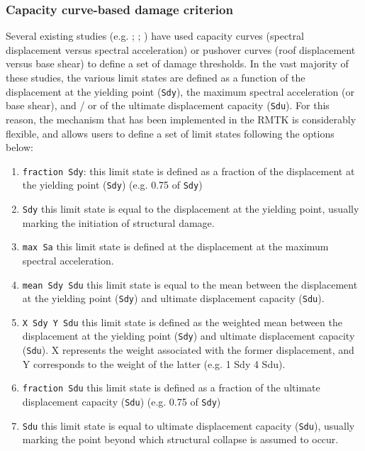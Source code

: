 \subsubsection{Capacity curve-based damage criterion}
\label{subsubsec:cc-dmg}
Several existing studies (e.g. \cite{Erberik2008}; \cite{SilvaEtAl2014c}; \cite{CasottoEtAl2005}) have used capacity curves (spectral displacement versus spectral acceleration) or pushover curves (roof displacement versus base shear) to define a set of damage thresholds. In the vast majority of these studies, the various limit states are defined as a function of the displacement at the yielding point (\verb=Sdy=), the maximum spectral acceleration (or base shear), and / or of the ultimate displacement capacity (\verb=Sdu=). For this reason, the mechanism that has been implemented in the RMTK is considerably flexible, and allows users to define a set of limit states following the options below:\\

\begin{enumerate}
 \item \verb=fraction Sdy=: this limit state is defined as a fraction of the displacement at the yielding point (\verb=Sdy=) (e.g. 0.75 of \verb=Sdy=)
 \item \verb=Sdy= this limit state is equal to the displacement at the yielding point, usually marking the initiation of structural damage.
 \item \verb=max Sa= this limit state is defined at the displacement at the maximum spectral acceleration.
 \item \verb=mean Sdy Sdu= this limit state is equal to the mean between the displacement at the yielding point (\verb=Sdy=) and ultimate displacement capacity (\verb=Sdu=).
 \item \verb=X Sdy Y Sdu= this limit state is defined as the weighted mean between the displacement at the yielding point (\verb=Sdy=) and ultimate displacement capacity (\verb=Sdu=). X represents the weight associated with the former displacement, and Y corresponds to the weight of the latter (e.g. 1 Sdy 4 Sdu).
 \item \verb=fraction Sdu= this limit state is defined as a fraction of the ultimate displacement capacity (\verb=Sdu=) (e.g. 0.75 of \verb=Sdy=)
 \item \verb=Sdu= this limit state is equal to ultimate displacement capacity (\verb=Sdu=), usually marking the point beyond which structural collapse is assumed to occur.\\
\end{enumerate}

